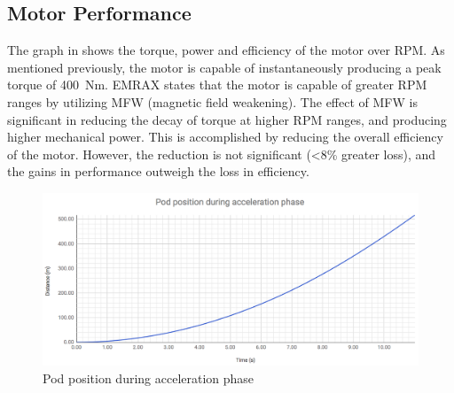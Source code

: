 \documentclass[main.tex]{subfiles}
\begin{document}
    \subsection{Motor Performance}
    The graph in  shows the torque, power and efficiency of the motor over RPM. As mentioned previously, the motor is capable of instantaneously producing a peak torque of \SI{400}{Nm}. EMRAX states that the motor is capable of greater RPM ranges by utilizing MFW (magnetic field weakening). The effect of MFW is significant in reducing the decay of torque at higher RPM ranges, and producing higher mechanical power. This is accomplished by reducing the overall efficiency of the motor. However, the reduction is not significant (\textless8\% greater loss), and the gains in performance outweigh the loss in efficiency.\\

    \begin{figure}[H]
        \centering
        \includegraphics[width=\linewidth]{images/pod_position_vs_time_curve.png}
        \caption{Pod position during acceleration phase}\label{pod-position}
    \end{figure}
    
\end{document}
